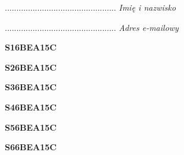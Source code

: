 \begin{turn}{90}\begin{minipage}{\linewidth} \vspace{20mm} ................................................  \textit{Imię i nazwisko}\end{minipage}\end{turn}

\begin{turn}{90}\begin{minipage}{\linewidth} \vspace{20mm} ................................................  \textit{Adres e-mailowy}\end{minipage}\end{turn}

\begin{turn}{90}\huge \begin{minipage}{\linewidth} \vspace{10mm}\textbf{S16BEA15C}\end{minipage}\end{turn}

\begin{turn}{90}\huge \begin{minipage}{\linewidth} \vspace{10mm}\textbf{S26BEA15C}\end{minipage}\end{turn}

\begin{turn}{90}\huge \begin{minipage}{\linewidth} \vspace{10mm}\textbf{S36BEA15C}\end{minipage}\end{turn}

\begin{turn}{90}\huge \begin{minipage}{\linewidth} \vspace{10mm}\textbf{S46BEA15C}\end{minipage}\end{turn}

\begin{turn}{90}\huge \begin{minipage}{\linewidth} \vspace{10mm}\textbf{S56BEA15C}\end{minipage}\end{turn}

\begin{turn}{90}\huge \begin{minipage}{\linewidth} \vspace{10mm}\textbf{S66BEA15C}\end{minipage}\end{turn}

